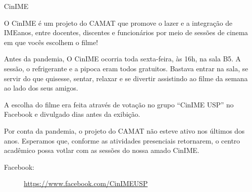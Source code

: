 \begin{subsecao}{CinIME}


O CinIME é um projeto do CAMAT que promove o
lazer e a integração de IMEanos, entre docentes, discentes e funcionários por
meio de sessões de cinema em que vocês escolhem o filme!

Antes da pandemia, O CinIME ocorria toda sexta-feira, às 16h, na sala B5. 
A sessão, o refrigerante e a pipoca eram todos gratuitos. Bastava entrar na sala, se servir do que
quisesse, sentar, relaxar e se divertir assistindo ao filme da semana ao lado dos
seus amigos.

A escolha do filme era feita através de votação no grupo “CinIME USP” no
Facebook e divulgado dias antes da exibição.

Por conta da pandemia, o projeto do CAMAT não esteve ativo nos últimos dos anos. Esperamos que, 
conforme as atividades presenciais retornarem, o centro acadêmico possa votlar com as sessões 
do nossa amado CinIME.






\begin{description}
  \item[Facebook:] \url{https://www.facebook.com/CinIMEUSP}
\end{description}

\end{subsecao}
